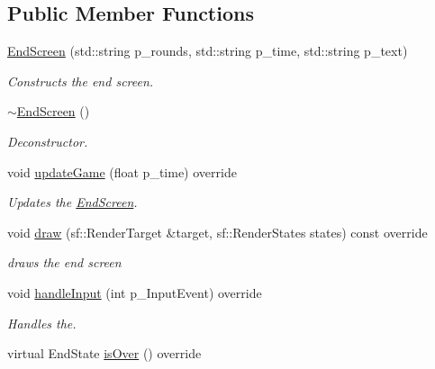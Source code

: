 \subsection*{Public Member Functions}
\begin{DoxyCompactItemize}
\item 
\mbox{\label{class_end_screen_a1da4fb23f00049e554bc5da3506248a3}} 
\mbox{\hyperlink{class_end_screen_a1da4fb23f00049e554bc5da3506248a3}{End\+Screen}} (std\+::string p\+\_\+rounds, std\+::string p\+\_\+time, std\+::string p\+\_\+text)
\begin{DoxyCompactList}\small\item\em Constructs the end screen. \end{DoxyCompactList}\item 
\mbox{\hyperlink{class_end_screen_a2bf71fd8fe94ee4ff206ff5303110864}{$\sim$\+End\+Screen}} ()
\begin{DoxyCompactList}\small\item\em Deconstructor. \end{DoxyCompactList}\item 
\mbox{\label{class_end_screen_acd68d144cfdf319138fb301f7f005fb0}} 
void \mbox{\hyperlink{class_end_screen_acd68d144cfdf319138fb301f7f005fb0}{update\+Game}} (float p\+\_\+time) override
\begin{DoxyCompactList}\small\item\em Updates the \mbox{\hyperlink{class_end_screen}{End\+Screen}}. \end{DoxyCompactList}\item 
void \mbox{\hyperlink{class_end_screen_a7116698624a0a4af8e746c50800fe432}{draw}} (sf\+::\+Render\+Target \&target, sf\+::\+Render\+States states) const override
\begin{DoxyCompactList}\small\item\em draws the end screen \end{DoxyCompactList}\item 
void \mbox{\hyperlink{class_end_screen_a33052db95f0c2aab9e4b2e0cbeec9e8e}{handle\+Input}} (int p\+\_\+\+Input\+Event) override
\begin{DoxyCompactList}\small\item\em Handles the. \end{DoxyCompactList}\item 
virtual End\+State \mbox{\hyperlink{class_end_screen_acd13799a074bb1984352a5262c3e3f29}{is\+Over}} () override

\end{DoxyCompactItemize}
